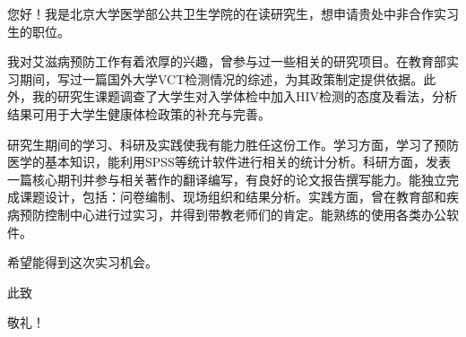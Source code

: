 \documentclass[10pt,stdletter,dateno,sigleft]{newlfm} %
\begin{document}
\begin{CJK}{UTF8}{gbsn}
\begin{newlfm}


\begin{spacing}{1.5}
您好！我是北京大学医学部公共卫生学院的在读研究生，想申请贵处中非合作实习生的职位。

我对艾滋病预防工作有着浓厚的兴趣，曾参与过一些相关的研究项目。在教育部实习期间，写过一篇国外大学VCT检测情况的综述，为其政策制定提供依据。此外，我的研究生课题调查了大学生对入学体检中加入HIV检测的态度及看法，分析结果可用于大学生健康体检政策的补充与完善。

研究生期间的学习、科研及实践使我有能力胜任这份工作。学习方面，学习了预防医学的基本知识，能利用SPSS等统计软件进行相关的统计分析。科研方面，发表一篇核心期刊并参与相关著作的翻译编写，有良好的论文报告撰写能力。能独立完成课题设计，包括：问卷编制、现场组织和结果分析。实践方面，曾在教育部和疾病预防控制中心进行过实习，并得到带教老师们的肯定。能熟练的使用各类办公软件。

希望能得到这次实习机会。

\begin{flushleft}此致\end{flushleft}

敬礼！
\end{spacing}


\end{newlfm}
\clearpage\end{CJK}
\end{document}
